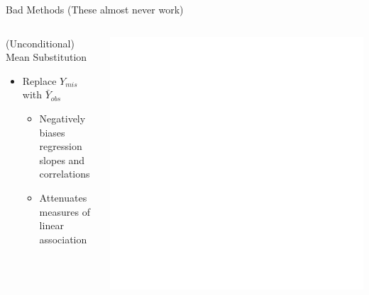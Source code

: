 \documentclass{beamer}\usepackage[]{graphicx}\usepackage[]{color}
\makeatletter
\def\maxwidth{ %
  \ifdim\Gin@nat@width>\linewidth
    \linewidth
  \else
    \Gin@nat@width
  \fi
}
\newenvironment{kframe}{%
 \def\at@end@of@kframe{}%
 \ifinner\ifhmode%
  \def\at@end@of@kframe{\end{minipage}}%
  \begin{minipage}{\columnwidth}%
 \fi\fi%
 \def\FrameCommand##1{\hskip\@totalleftmargin \hskip-\fboxsep
 \colorbox{shadecolor}{##1}\hskip-\fboxsep
     \hskip-\linewidth \hskip-\@totalleftmargin \hskip\columnwidth}%
 \MakeFramed {\advance\hsize-\width
   \@totalleftmargin\z@ \linewidth\hsize
   \@setminipage}}%
 {\par\unskip\endMakeFramed%
 \at@end@of@kframe}
\newenvironment{knitrout}{}{} %
\makeatother
\begin{document}
\begin{frame}{Bad Methods (These almost never work)}
  
  \begin{columns}
    \begin{column}{0.5\textwidth}
      
      (Unconditional) Mean Substitution
      \begin{itemize}
      \item Replace $Y_{mis}$ with $\bar{Y}_{obs}$
        \begin{itemize}
        \item Negatively biases regression slopes and correlations
        \item Attenuates measures of linear association
        \end{itemize}
      \end{itemize}
      
    \end{column}
    \begin{column}{0.5\textwidth}
      
\begin{knitrout}\footnotesize
{}\color{fgcolor}\begin{kframe}


{\ttfamily\noindent\bfseries\color{errorcolor}{Error in check.dataform(data): object 'dat3' not found}}

{\ttfamily\noindent\bfseries\color{errorcolor}{Error in complete(miceM, 1): object 'miceM' not found}}

{\ttfamily\noindent\bfseries\color{errorcolor}{Error in datM[!rVec, ] <- NA: object 'datM' not found}}

{\ttfamily\noindent\bfseries\color{errorcolor}{Error in FUN(X[[i]], ...): object 'dat2' not found}}\end{kframe}

{\centering \includegraphics[width=\maxwidth]{figure/intro-unnamed-chunk-22-1} 

}
\end{knitrout}
\end{column}
\end{columns}
\end{frame}
\end{document}
